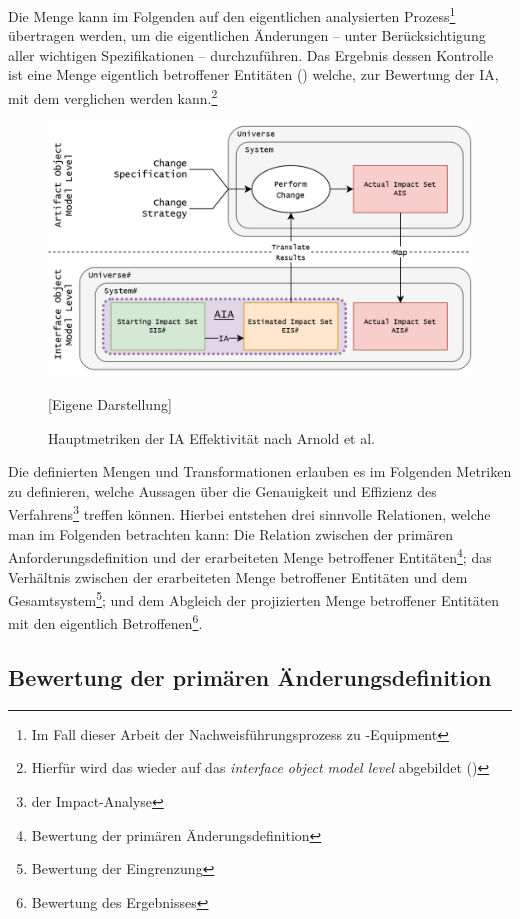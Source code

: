 \noindent
Die  Menge kann im Folgenden auf den eigentlichen analysierten Prozess\footnote{Im Fall dieser Arbeit der Nachweisführungsprozess zu \atmans-Equipment} übertragen werden, um die eigentlichen Änderungen -- unter Berücksichtigung  aller wichtigen Spezifikationen -- durchzuführen.
Das Ergebnis dessen Kontrolle ist eine Menge eigentlich betroffener Entitäten () welche, zur Bewertung der \ac{IA}, mit dem  verglichen werden kann.\footnote{Hierfür wird das  wieder auf das \textit{interface object model level} abgebildet ()}

\begin{figure}[H]
    \centering
    \includegraphics[width=1\linewidth]{gfx/IA35.drawio.png}
    \caption{Hauptmetriken der \ac{IA} Effektivität nach Arnold et al. \cite[296]{app_bohner}}
    [Eigene Darstellung]
    \label{fig:aia}
\end{figure}

\pagebreak

\noindent
Die definierten Mengen und Transformationen erlauben es im Folgenden Metriken zu definieren, welche Aussagen über die Genauigkeit und Effizienz des Verfahrens\footnote{der Impact-Analyse} treffen können.
Hierbei entstehen drei sinnvolle Relationen, welche man im Folgenden betrachten kann:
Die Relation zwischen der primären Anforderungsdefinition und der erarbeiteten Menge betroffener Entitäten\footnote{Bewertung der primären Änderungsdefinition}; das Verhältnis zwischen der erarbeiteten Menge betroffener Entitäten und dem Gesamtsystem\footnote{Bewertung der Eingrenzung}; und dem Abgleich der projizierten Menge betroffener Entitäten mit den eigentlich Betroffenen\footnote{Bewertung des Ergebnisses}.


\subsection{Bewertung der primären Änderungsdefinition}

